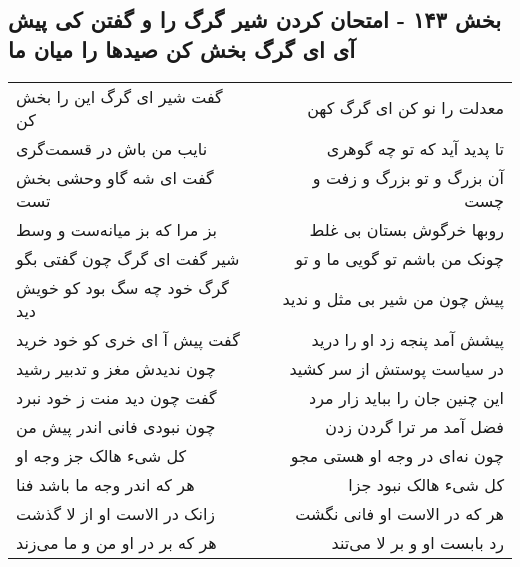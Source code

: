 \begin{center}
\section*{بخش ۱۴۳ - امتحان کردن شیر گرگ را و گفتن کی پیش آی ای گرگ بخش کن صیدها را میان ما}
\label{sec:sh143}
\begin{longtable}{l p{0.5cm} r}
گفت شیر ای گرگ این را بخش کن
&&
معدلت را نو کن ای گرگ کهن
\\
نایب من باش در قسمت‌گری
&&
تا پدید آید که تو چه گوهری
\\
گفت ای شه گاو وحشی بخش تست
&&
آن بزرگ و تو بزرگ و زفت و چست
\\
بز مرا که بز میانه‌ست و وسط
&&
روبها خرگوش بستان بی غلط
\\
شیر گفت ای گرگ چون گفتی بگو
&&
چونک من باشم تو گویی ما و تو
\\
گرگ خود چه سگ بود کو خویش دید
&&
پیش چون من شیر بی مثل و ندید
\\
گفت پیش آ ای خری کو خود خرید
&&
پیشش آمد پنجه زد او را درید
\\
چون ندیدش مغز و تدبیر رشید
&&
در سیاست پوستش از سر کشید
\\
گفت چون دید منت ز خود نبرد
&&
این چنین جان را بباید زار مرد
\\
چون نبودی فانی اندر پیش من
&&
فضل آمد مر ترا گردن زدن
\\
کل شیء هالک جز وجه او
&&
چون نه‌ای در وجه او هستی مجو
\\
هر که اندر وجه ما باشد فنا
&&
کل شیء هالک نبود جزا
\\
زانک در الاست او از لا گذشت
&&
هر که در الاست او فانی نگشت
\\
هر که بر در او من و ما می‌زند
&&
رد بابست او و بر لا می‌تند
\\
\end{longtable}
\end{center}
